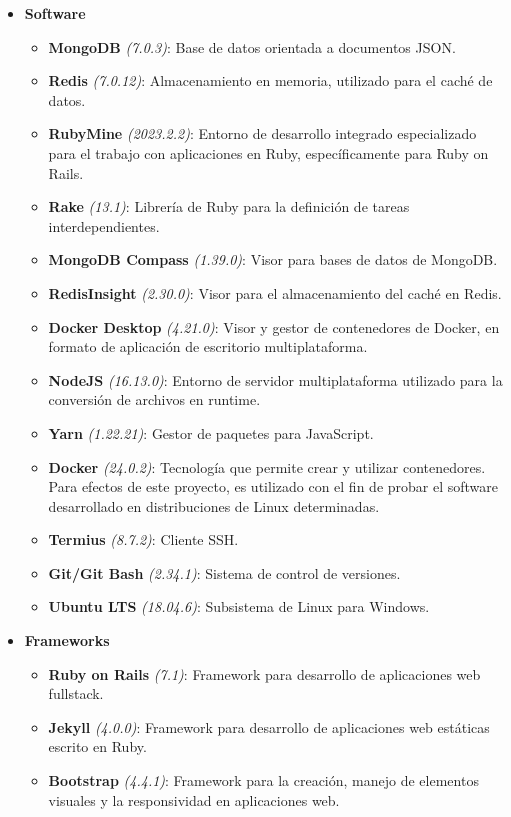 \begin{itemize}
	\item[] \textbf{Software}
	\begin{itemize}
		\item \textbf{MongoDB} \textit{(7.0.3)}: Base de datos orientada a documentos JSON.
		\item \textbf{Redis} \textit{(7.0.12)}: Almacenamiento en memoria, utilizado para el caché de datos.
		\item \textbf{RubyMine} \textit{(2023.2.2)}: Entorno de desarrollo integrado especializado para el trabajo con aplicaciones en Ruby, específicamente para Ruby on Rails.
		\item \textbf{Rake} \textit{(13.1)}: Librería de Ruby para la definición de tareas interdependientes.
		\item \textbf{MongoDB Compass} \textit{(1.39.0)}: Visor para bases de datos de MongoDB.
		\item \textbf{RedisInsight} \textit{(2.30.0)}: Visor para el almacenamiento del caché en Redis.
		\item \textbf{Docker Desktop} \textit{(4.21.0)}: Visor y gestor de contenedores de Docker, en formato de aplicación de escritorio multiplataforma.
		\item \textbf{NodeJS} \textit{(16.13.0)}: Entorno de servidor multiplataforma utilizado para la conversión de archivos en runtime.
		\item \textbf{Yarn} \textit{(1.22.21)}: Gestor de paquetes para JavaScript.
		\item \textbf{Docker} \textit{(24.0.2)}: Tecnología que permite crear y utilizar contenedores. Para efectos de este proyecto, es utilizado con el fin de probar el software desarrollado en distribuciones de Linux determinadas.
		\item \textbf{Termius} \textit{(8.7.2)}: Cliente SSH.
		\item \textbf{Git/Git Bash} \textit{(2.34.1)}: Sistema de control de versiones.
		\item \textbf{Ubuntu LTS} \textit{(18.04.6)}: Subsistema de Linux para Windows.
	\end{itemize}
\end{itemize}

\begin{itemize}
	\item[] \textbf{Frameworks}
	\begin{itemize}
		\item \textbf{Ruby on Rails} \textit{(7.1)}: Framework para desarrollo de aplicaciones web fullstack.
		\item \textbf{Jekyll} \textit{(4.0.0)}: Framework para desarrollo de aplicaciones web estáticas escrito en Ruby.
		\item \textbf{Bootstrap} \textit{(4.4.1)}: Framework para la creación, manejo de elementos visuales y la responsividad en aplicaciones web.
	\end{itemize}
\end{itemize}
